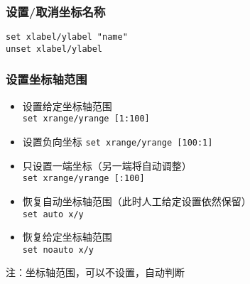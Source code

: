 \subsubsection{设置/取消坐标名称}
 \begin{verbatim}
set xlabel/ylabel "name"
unset xlabel/ylabel
\end{verbatim}


\subsubsection{设置坐标轴范围}
\begin{itemize}
\item 设置给定坐标轴范围\\
\verb|set xrange/yrange [1:100]|

\item 设置负向坐标
\verb|set xrange/yrange [100:1]|

\item 只设置一端坐标（另一端将自动调整）\\
\verb|set xrange/yrange [:100]|

\item 恢复自动坐标轴范围（此时人工给定设置依然保留）\\
\verb|set auto x/y|

\item  恢复给定坐标轴范围\\
\verb|set noauto x/y|
\end{itemize}

注：坐标轴范围，可以不设置，自动判断




